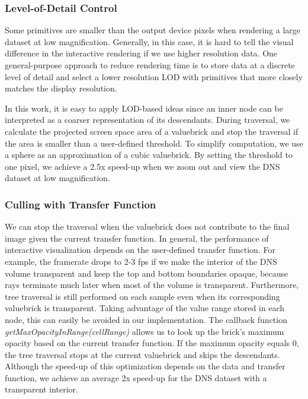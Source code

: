 \subsubsection{Level-of-Detail Control}
Some primitives are smaller than the output device pixels when rendering a
large dataset at low magnification\cite{rusinkiewicz2000qsplat}. Generally, in this case,
it is hard to tell the visual difference in the interactive rendering if we use higher resolution data. 
One general-purpose approach to 
reduce rendering time is to store data at a discrete level of detail and select a lower resolution LOD with primitives that more closely matches the display resolution. 

In this work, it is easy to apply LOD-based ideas since an inner node can be interpreted as
a coarser representation of its descendants. During traversal, we calculate the projected
screen space area of a valuebrick and stop the traversal if the area is smaller than a 
user-defined threshold. To simplify computation, we use a sphere as an approximation of a cubic
valuebrick. By setting the threshold to one pixel, we achieve a 2.5x speed-up when we 
zoom out and view the DNS dataset at low magnification. 


\subsubsection{Culling with Transfer Function}
We can stop the traversal when the valuebrick does not contribute to the 
final image given the current transfer function. In general, the performance of interactive visualization
depends on the user-defined transfer function.
For example, the framerate drops to 2-3 fps if we make the interior of the DNS volume transparent and keep the
top and bottom boundaries opaque, because rays terminate much later
when most of the volume is transparent. Furthermore, tree traversal is still performed on each
sample even when its corresponding valuebrick is transparent. Taking advantage of the value
range stored in each node, this can easily be avoided in our implementation. The callback
function \textit{getMaxOpacityInRange(cellRange)} allows us to look up the brick's maximum
opacity based on the current transfer function.
If the maximum opacity equals 0, the tree traversal stops at the 
current valuebrick and skips the descendants. Although the speed-up of this optimization
depends on the data and transfer function, we achieve an average 2x speed-up for
the DNS dataset with a transparent interior.



